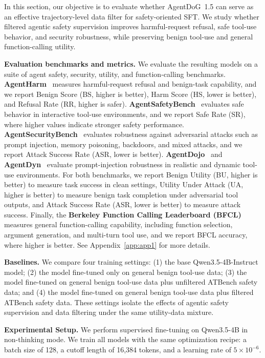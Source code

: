 \documentclass{llmxive}
\providecommand{\toolAG}{{\agentdog{}}\xspace}
\providecommand{\agentdog}{AgentDoG~1.5\xspace}
\begin{document}
In this section, our objective is to evaluate whether \toolAG{} can serve as an effective trajectory-level data filter for safety-oriented SFT. We study whether filtered agentic safety supervision improves harmful-request refusal, safe tool-use behavior, and security robustness, while preserving benign tool-use and general function-calling utility.



\textbf{Evaluation benchmarks and metrics.}
We evaluate the resulting models on a suite of agent safety, security, utility, and function-calling benchmarks.
\textbf{AgentHarm}~\citep{agentharm2024} measures harmful-request refusal and benign-task capability, and we report Benign Score (BS, higher is better), Harm Score (HS, lower is better), and Refusal Rate (RR, higher is safer).
\textbf{AgentSafetyBench}~\citep{zhang2024agentsafetybench} evaluates safe behavior in interactive tool-use environments, and we report Safe Rate (SR), where higher values indicate stronger safety performance.
\textbf{AgentSecurityBench}~\citep{zhang2025agent} evaluates robustness against adversarial attacks such as prompt injection, memory poisoning, backdoors, and mixed attacks, and we report Attack Success Rate (ASR, lower is better).
\textbf{AgentDojo}~\citep{agentdojo2024} and \textbf{AgentDyn}~\citep{li2026agentdyn} evaluate prompt-injection robustness in realistic and dynamic tool-use environments. For both benchmarks, we report Benign Utility (BU, higher is better) to measure task success in clean settings, Utility Under Attack (UA, higher is better) to measure benign task completion under adversarial tool outputs, and Attack Success Rate (ASR, lower is better) to measure attack success.
Finally, the \textbf{Berkeley Function Calling Leaderboard (BFCL)}~\citep{patil2025bfcl}  measures general function-calling capability, including function selection, argument generation, and multi-turn tool use, and we report BFCL accuracy, where higher is better. See Appendix~\ref{app:app1} for more details.

\textbf{Baselines.}
We compare four training settings: (1) the base Qwen3.5-4B-Instruct model; (2) the model fine-tuned only on general benign tool-use data; (3) the model fine-tuned on general benign tool-use data plus unfiltered ATBench safety data; and (4) the model fine-tuned on general benign tool-use data plus filtered ATBench safety data. These settings isolate the effects of agentic safety supervision and data filtering under the same utility-data mixture.

\textbf{Experimental Setup.} 
We perform supervised fine-tuning on Qwen3.5-4B in non-thinking mode. 
We train all models with the same optimization recipe: a batch size of 128, a cutoff length of 16,384 tokens, and a learning rate of \(5\times10^{-6}\).
\end{document}
